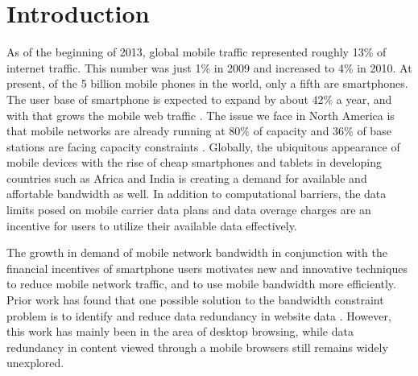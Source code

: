 \section{Introduction}
As of the beginning of 2013, global mobile traffic represented roughly 13\% of internet traffic. This number was just 1\% in 2009 and increased to 4\% in 2010. At present, of the 5 billion mobile phones in the world, only a fifth are smartphones. The user base of smartphone is expected to expand by about 42\% a year, and with that grows the mobile web traffic \cite{olson}. The issue we face in North America is that mobile networks are already running at 80\% of capacity and 36\% of base stations are facing capacity constraints \cite{baldwin}. Globally, the ubiquitous appearance of mobile devices with the rise of cheap smartphones and tablets in developing countries such as Africa and India is creating a demand for available and affortable bandwidth as well. In addition to computational barriers, the data limits posed on mobile carrier data plans and data overage charges are an incentive for users to utilize their available data effectively. 

The growth in demand of mobile network bandwidth in conjunction with the financial incentives of smartphone users motivates new and innovative techniques to reduce mobile network traffic, and to use mobile bandwidth more efficiently. Prior work has found that one possible solution to the bandwidth constraint problem is to identify and reduce data redundancy in website data \cite{spring}. However, this work has mainly been in the area of desktop browsing, while data redundancy in content viewed through a mobile browsers still remains widely unexplored.  

